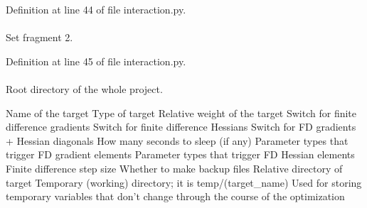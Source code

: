 \-Definition at line 44 of file interaction.\-py.

\hypertarget{classforcebalance_1_1interaction_1_1Interaction_a98d153938051d0290f3164f28305f160}{
\paragraph[{select2}]{}}\label{classforcebalance_1_1interaction_1_1Interaction_a98d153938051d0290f3164f28305f160}


\-Set fragment 2. 



\-Definition at line 45 of file interaction.\-py.

\hypertarget{classforcebalance_1_1target_1_1Target_aede2856573b890cd47054ad36937d6f6}{
\paragraph[{tempdir}]{}}\label{classforcebalance_1_1target_1_1Target_aede2856573b890cd47054ad36937d6f6}


\-Root directory of the whole project. 

\-Name of the target \-Type of target \-Relative weight of the target \-Switch for finite difference gradients \-Switch for finite difference \-Hessians \-Switch for \-F\-D gradients + \-Hessian diagonals \-How many seconds to sleep (if any) \-Parameter types that trigger \-F\-D gradient elements \-Parameter types that trigger \-F\-D \-Hessian elements \-Finite difference step size \-Whether to make backup files \-Relative directory of target \-Temporary (working) directory; it is temp/(target\-\_\-name) \-Used for storing temporary variables that don't change through the course of the optimization 

